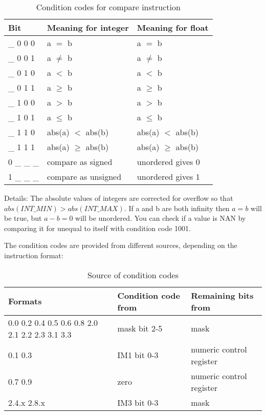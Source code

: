 \documentclass[forwardcom.tex]{subfiles}
\begin{document}
\begin{longtable} {|p{14mm}|p{55mm}|p{55mm}|}
\caption{Condition codes for compare instruction} 
\label{table:conditionCodesForCompareInstruction} \\
\endfirsthead
\endhead
\hline
\bfseries Bit & \bfseries Meaning for integer & \bfseries Meaning for float \\
\hline
\_ 0 0 0 & a $=$ b & a $=$ b \\
\_ 0 0 1 & a $\neq$ b & a $\neq$ b \\
\_ 0 1 0 & a $<$ b & a $<$ b \\
\_ 0 1 1 & a $\geq$ b & a $\geq$ b \\
\_ 1 0 0 & a $>$ b & a $>$ b \\
\_ 1 0 1 & a $\leq$ b & a $\leq$ b \\
\_ 1 1 0 & abs(a) $<$ abs(b) & abs(a) $<$ abs(b) \\
\_ 1 1 1 & abs(a) $\geq$ abs(b) & abs(a) $\geq$ abs(b) \\
\hline
0 \_ \_ \_ & compare as signed & unordered gives 0 \\
1 \_ \_ \_ & compare as unsigned & unordered gives 1 \\
\hline
\end{longtable}
Details: The absolute values of integers are corrected for overflow so that $abs(INT\_MIN) > abs(INT\_MAX)$.
If a and b are both infinity then $a = b$ will be true, but $a-b = 0$ will be unordered.
You can check if a value is NAN by comparing it for unequal to itself with condition code 1001.

\vspace{2mm}
The condition codes are provided from different sources, depending on the instruction format:

\begin{longtable} {|p{25mm}|p{50mm}|p{50mm}|}
\caption{Source of condition codes} 
\label{table:SourceOfConditionCodes} \\
\endfirsthead
\endhead
\hline
\bfseries Formats & \bfseries Condition code from & \bfseries Remaining bits from \\
\hline
0.0 0.2 0.4 0.5 0.6 0.8 2.0 2.1 2.2 2.3 3.1 3.3 & mask bit 2-5 & mask \\
\hline
0.1 0.3     & IM1 bit 0-3 & numeric control register \\
\hline
0.7 0.9        & zero & numeric control register \\
\hline
2.4.x 2.8.x       & IM3 bit 0-3 & mask  \\
\hline
\end{longtable}
\end{document}
